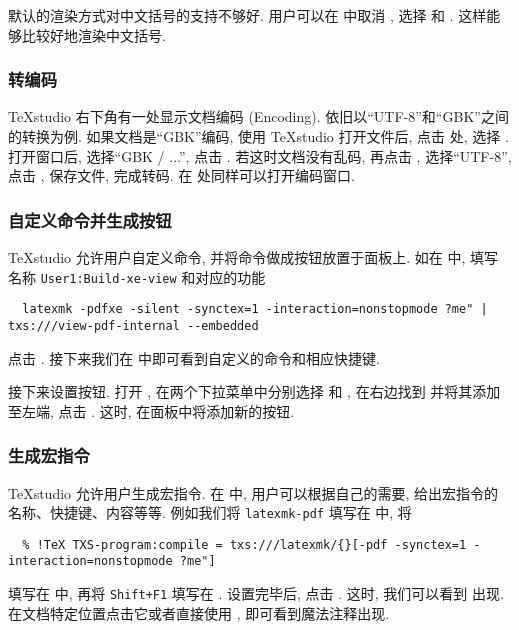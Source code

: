 默认的渲染方式对中文括号的支持不够好. 
用户可以在  中取消
,
选择  和 .
这样能够比较好地渲染中文括号. 

\subsubsection{转编码}

\TeX studio 右下角有一处显示文档编码 (Encoding). 
依旧以``UTF-8''和``GBK''之间的转换为例. 
如果文档是``GBK''编码, 使用 \TeX studio 打开文件后,
点击  处, 选择 .
打开窗口后, 选择``GBK / ...'', 点击 .
若这时文档没有乱码, 再点击 ,
选择``UTF-8'', 点击 , 保存文件, 完成转码.
在  处同样可以打开编码窗口.

\subsubsection{自定义命令并生成按钮}

\TeX studio 允许用户自定义命令, 并将命令做成按钮放置于面板上.
如在  中,
填写名称 \texttt{User1:Build-xe-view}
和对应的功能
\begin{lstlisting}
  latexmk -pdfxe -silent -synctex=1 -interaction=nonstopmode ?me" | txs:///view-pdf-internal --embedded
\end{lstlisting}
点击 . 
接下来我们在  中即可看到自定义的命令和相应快捷键.

接下来设置按钮.
打开 ,
在两个下拉菜单中分别选择  和 ,
在右边找到  并将其添加至左端,
点击 . 
这时, 在面板中将添加新的按钮. 

\subsubsection{生成宏指令}

\TeX studio 允许用户生成宏指令.
在  中, 用户可以根据自己的需要,
给出宏指令的名称、快捷键、内容等等.
例如我们将 \texttt{latexmk-pdf} 填写在  中,
将
\begin{lstlisting}
  % !TeX TXS-program:compile = txs:///latexmk/{}[-pdf -synctex=1 -interaction=nonstopmode ?me"]
\end{lstlisting}
填写在  中,
再将 \texttt{Shift+F1} 填写在 .
设置完毕后, 点击 .
这时, 我们可以看到  出现.
在文档特定位置点击它或者直接使用 , 即可看到魔法注释出现.

